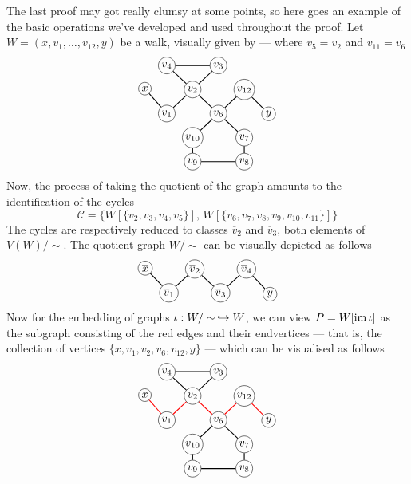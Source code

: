 The last proof may got really clumsy at some points, so here goes an example of
the basic operations we've developed and used throughout the proof. Let \(W =
(x, v_1, \dots, v_{12}, y)\) be a walk, visually given by --- where \(v_5 =
v_2\) and \(v_{11} = v_6\)
\[
  \begin{tikzcd}[%
    , cells={nodes={circle, draw, inner sep=1.5pt}}
    , every arrow/.append style={dash,thick}
    , row sep=tiny
    , column sep=tiny
    ]
              &v_4 \ar[rr] \ar[dr] & &v_3 \ar[dl] & &
    \\
    x \ar[dr] & &v_2 \ar[dl] \ar[dr] & &v_{12} \ar[dr] &
    \\
              &v_1 & &v_6 \ar[ur] \ar[dl] \ar[dr] & &y
    \\
              & &v_{10} \ar[d] & &v_7 \ar[d] &
    \\
              & &v_9 \ar[rr] & &v_8 &
  \end{tikzcd}
\]
Now, the process of taking the quotient of the graph amounts to the
identification of the cycles
\[
  \mathcal C = \{W[\{v_2, v_3, v_4, v_5\}],\,
  W[\{v_6, v_7, v_8, v_9, v_{10}, v_{11}\}]\}
\]
The cycles are respectively reduced to classes \(\overline v_2\) and \(\overline
v_3\), both elements of \(V(W)/\sim\). The quotient graph \(W/\sim\) can be
visually depicted as follows
\[
  \begin{tikzcd}[%
    , cells={nodes={circle, draw, inner sep=1.5pt}}
    , every arrow/.append style={dash,thick}
    , row sep=tiny
    , column sep=tiny
    ]
    \overline x \ar[dr]
    & &\overline v_2 \ar[dl] \ar[dr] & &\overline v_4 \ar[dl] \ar[dr] &
    \\
    &\overline v_1 & &\overline v_3 & &y
  \end{tikzcd}
\]
Now for the embedding of graphs \(\iota: W/\sim\, \hookrightarrow W\), we can view \(P =
W[\operatorname{im}\iota]\) as the subgraph consisting of the red edges and their endvertices
--- that is, the collection of vertices \(\{x, v_1, v_2, v_6, v_{12}, y\}\) ---
which can be visualised as follows
\[
  \begin{tikzcd}[%
    , cells={nodes={circle, draw, inner sep=1.5pt}}
    , every arrow/.append style={dash,thick}
    , row sep=tiny
    , column sep=tiny
    ]
              &v_4 \ar[rr] \ar[dr] & &v_3 \ar[dl] & &
    \\
    x \ar[dr, color=red] & &v_2 \ar[dl, color=red] \ar[dr, color=red]
                         & &v_{12} \ar[dr, color=red] &
    \\
              &v_1 & &v_6 \ar[ur, color=red] \ar[dl] \ar[dr] & &y
    \\
              & &v_{10} \ar[d] & &v_7 \ar[d] &
    \\
              & &v_9 \ar[rr] & &v_8 &
  \end{tikzcd}
\]


